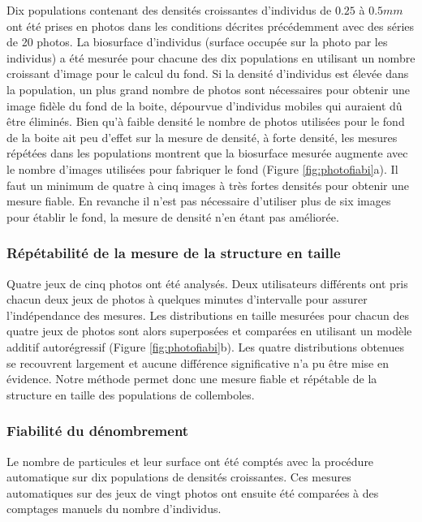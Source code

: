 Dix populations contenant des densités croissantes d'individus de $0.25$ à
$0.5mm$ ont été prises en photos dans les conditions décrites précédemment avec
des séries de 20 photos. La biosurface d'individus (surface occupée sur la photo
par les individus) a été mesurée pour chacune des dix populations en utilisant
un nombre croissant d'image pour le calcul du fond. Si la densité d'individus est
élevée dans la population, un plus grand nombre de photos sont nécessaires pour
obtenir une image fidèle du fond de la boite, dépourvue d'individus mobiles qui
auraient dû être éliminés. Bien qu'à faible densité le nombre de photos
utilisées pour le fond de la boite ait peu d'effet sur la mesure de densité, à forte
densité, les mesures répétées dans les populations montrent que la biosurface
mesurée augmente avec le nombre d'images utilisées pour fabriquer le fond
(Figure \ref{fig:photofiabi}a). Il faut un minimum de quatre à cinq images à
très fortes densités pour obtenir une mesure fiable. En revanche il n'est pas
nécessaire d'utiliser plus de six images pour établir le fond, la mesure
de densité n'en étant pas améliorée. 

\subsubsection{Répétabilité de la mesure de la structure en taille}

Quatre jeux de cinq photos ont été analysés. Deux utilisateurs différents ont
pris chacun deux jeux de photos à quelques minutes d'intervalle pour assurer
l'indépendance des mesures. Les distributions en taille mesurées pour chacun des
quatre jeux de photos sont alors superposées et comparées en utilisant un modèle
additif autorégressif (Figure \ref{fig:photofiabi}b). Les quatre distributions
obtenues se recouvrent largement et aucune différence significative n'a pu être
mise en évidence. Notre méthode permet donc une mesure fiable et répétable de la
structure en taille des populations de collemboles.

\subsubsection{Fiabilité du dénombrement}

Le nombre de particules et leur surface ont été comptés avec la procédure
automatique sur dix populations de densités croissantes. Ces mesures
automatiques sur des jeux de vingt photos ont ensuite été comparées à des comptages manuels
du nombre d'individus. 

